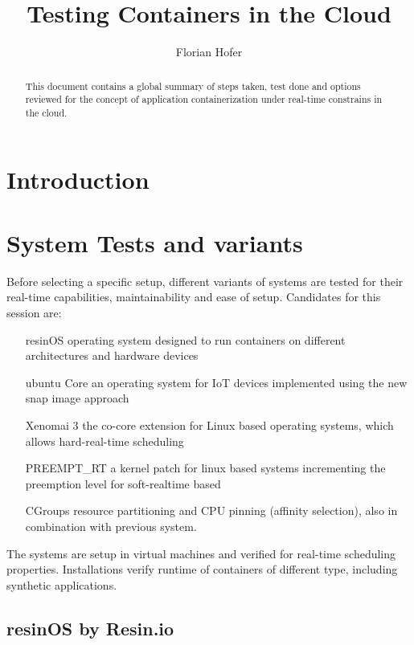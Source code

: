\documentclass[]{scrartcl}
\title{Testing Containers in the Cloud}
\author{Florian Hofer}
\begin{document}
\maketitle

\begin{abstract}
	This document contains a global summary of steps taken, test done and options reviewed for the concept of application containerization under real-time constrains in the cloud.
\end{abstract}

\section{Introduction}




\section{System Tests and variants}

Before selecting a specific setup, different variants of systems are tested for their real-time capabilities, maintainability and ease of setup. Candidates for this session are:

\begin{itemize}
	\item[resinOS] operating system designed to run containers on different architectures and hardware devices
	\item[ubuntu Core] an operating system for IoT devices implemented using the new snap image approach
	\item[Xenomai 3] the co-core extension for Linux based operating systems, which allows hard-real-time scheduling
	\item[PREEMPT\_RT] a kernel patch for linux based systems incrementing the preemption level for soft-realtime based
	\item[CGroups] resource partitioning and CPU pinning (affinity selection), also in combination with previous system.
\end{itemize}

The systems are setup in virtual machines and verified for real-time scheduling properties. Installations verify runtime of containers of different type, including synthetic applications.

\subsection{resinOS by Resin.io}
\end{document}
